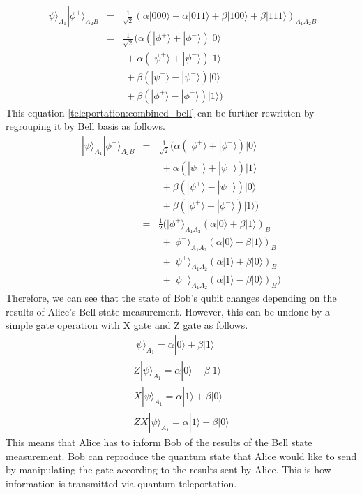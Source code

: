 \begin{eqnarray}
    \label{teleportation:combined_bell}
    |\psi\rangle_{A_1} |\phi^+\rangle_{A_2B}  
    & = & \frac{1}{\sqrt{2}} (\alpha |000\rangle + \alpha |011\rangle + \beta |100\rangle + \beta |111\rangle)_{A_1A_2B} \nonumber\\
    & = & \frac{1}{\sqrt{2}} (\alpha (|\phi^+\rangle + |\phi^-\rangle)|0\rangle \nonumber\\
                            &\;& \;+ \alpha (|\psi^+\rangle + |\psi^-\rangle)|1\rangle \nonumber\\
                            &\;& \;+ \beta (|\psi^+\rangle - |\psi^-\rangle)|0\rangle \nonumber\\
                            &\;& \;+ \beta (|\phi^+\rangle - |\phi^-\rangle)|1\rangle)
\end{eqnarray}
This equation \ref{teleportation:combined_bell} can be further rewritten by regrouping it by Bell basis as follows.
\begin{eqnarray}
    \label{teleportation:bell_basis}
    |\psi\rangle_{A_1} |\phi^+\rangle_{A_2B}  
    & = & \frac{1}{\sqrt{2}} (\alpha (|\phi^+\rangle + |\phi^-\rangle)|0\rangle \nonumber\\
                            &\;& \;+ \alpha (|\psi^+\rangle + |\psi^-\rangle)|1\rangle \nonumber\\
                            &\;& \;+ \beta (|\psi^+\rangle - |\psi^-\rangle)|0\rangle \nonumber\\
                            &\;& \;+ \beta (|\phi^+\rangle - |\phi^-\rangle)|1\rangle) \nonumber\\
    & = & \frac{1}{2} (|\phi^+\rangle_{A_1A_2} (\alpha |0\rangle + \beta |1\rangle)_B \nonumber\\
                    &\;& \;+ |\phi^-\rangle_{A_1A_2} (\alpha |0\rangle - \beta |1\rangle)_B \nonumber\\
                    &\;& \;+ |\psi^+\rangle_{A_1A_2} (\alpha |1\rangle + \beta |0\rangle)_B \nonumber\\
                    &\;& \;+ |\psi^-\rangle_{A_1A_2} (\alpha |1\rangle - \beta |0\rangle)_B)
\end{eqnarray}
Therefore, we can see that the state of Bob's qubit changes depending on the results of Alice's Bell state measurement.
However, this can be undone by a simple gate operation with X gate and Z gate as follows.
\begin{eqnarray}
    |\psi\rangle_{A_1} = \alpha |0\rangle + \beta |1\rangle\\
    Z|\psi\rangle_{A_1} = \alpha |0\rangle - \beta |1\rangle\\
    X|\psi\rangle_{A_1} = \alpha |1\rangle + \beta |0\rangle\\
    ZX|\psi\rangle_{A_1} = \alpha |1\rangle - \beta |0\rangle
\end{eqnarray}
This means that Alice has to inform Bob of the results of the Bell state measurement. 
Bob can reproduce the quantum state that Alice would like to send by manipulating the gate according to the results sent by Alice.
This is how information is transmitted via quantum teleportation.
\clearpage

